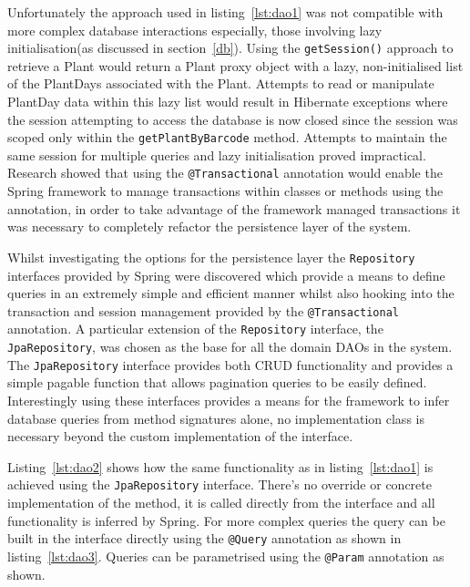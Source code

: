 Unfortunately the approach used in  listing~\ref{lst:dao1} was not compatible with more complex database interactions especially, those involving lazy initialisation(as discussed in section~\ref{db}). Using the \texttt{getSession()} approach to retrieve a Plant would return a Plant proxy object with a lazy, non-initialised list of the PlantDays associated with the Plant. Attempts to read or manipulate PlantDay data within this lazy list would result in Hibernate exceptions where the session attempting to access the database is now closed since the session was scoped only within the \texttt{getPlantByBarcode} method. Attempts to maintain the same session for multiple queries and lazy initialisation proved impractical. Research showed that using the \texttt{@Transactional} annotation would enable the Spring framework to manage transactions within classes or methods using the annotation, in order to take advantage of the framework managed transactions it was necessary to completely refactor the persistence layer of the system.

Whilst investigating the options for the persistence layer the \texttt{Repository} interfaces provided by Spring were discovered which provide a means to define queries in an extremely simple and efficient manner whilst also hooking into the transaction and session management provided by the \texttt{@Transactional} annotation. A particular extension of the \texttt{Repository} interface, the \texttt{JpaRepository}, was chosen as the base for all the domain DAOs in the system. The \texttt{JpaRepository} interface provides both CRUD functionality and provides a simple pagable function that allows pagination queries to be easily defined. Interestingly using these interfaces provides a means for the framework to infer database queries from method signatures alone, no implementation class is necessary beyond the custom implementation of the interface. 


Listing~\ref{lst:dao2} shows how the same functionality as in listing~\ref{lst:dao1} is achieved using the \texttt{JpaRepository} interface. There's no override or concrete implementation of the method, it is called directly from the interface and all functionality is inferred by Spring. For more complex queries the query can be built in the interface directly using the \texttt{@Query} annotation as shown in listing~\ref{lst:dao3}. Queries can be parametrised using the \texttt{@Param} annotation as shown.


